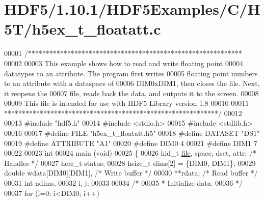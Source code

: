 \hypertarget{_h_d_f5_21_810_81_2_h_d_f5_examples_2_c_2_h5_t_2h5ex__t__floatatt_8c_source}{}\section{H\+D\+F5/1.10.1/\+H\+D\+F5\+Examples/\+C/\+H5\+T/h5ex\+\_\+t\+\_\+floatatt.c}
\label{_h_d_f5_21_810_81_2_h_d_f5_examples_2_c_2_h5_t_2h5ex__t__floatatt_8c_source}

\begin{DoxyCode}
00001 \textcolor{comment}{/************************************************************}
00002 \textcolor{comment}{}
00003 \textcolor{comment}{  This example shows how to read and write floating point}
00004 \textcolor{comment}{  datatypes to an attribute.  The program first writes}
00005 \textcolor{comment}{  floating point numbers to an attribute with a dataspace of}
00006 \textcolor{comment}{  DIM0xDIM1, then closes the file.  Next, it reopens the}
00007 \textcolor{comment}{  file, reads back the data, and outputs it to the screen.}
00008 \textcolor{comment}{}
00009 \textcolor{comment}{  This file is intended for use with HDF5 Library version 1.8}
00010 \textcolor{comment}{}
00011 \textcolor{comment}{ ************************************************************/}
00012 
00013 \textcolor{preprocessor}{#include "hdf5.h"}
00014 \textcolor{preprocessor}{#include <stdio.h>}
00015 \textcolor{preprocessor}{#include <stdlib.h>}
00016 
00017 \textcolor{preprocessor}{#define FILE            "h5ex\_t\_floatatt.h5"}
00018 \textcolor{preprocessor}{#define DATASET         "DS1"}
00019 \textcolor{preprocessor}{#define ATTRIBUTE       "A1"}
00020 \textcolor{preprocessor}{#define DIM0            4}
00021 \textcolor{preprocessor}{#define DIM1            7}
00022 
00023 \textcolor{keywordtype}{int}
00024 main (\textcolor{keywordtype}{void})
00025 \{
00026     hid\_t       \hyperlink{structfile}{file}, space, dset, attr;            \textcolor{comment}{/* Handles */}
00027     herr\_t      status;
00028     hsize\_t     dims[2] = \{DIM0, DIM1\};
00029     \textcolor{keywordtype}{double}      wdata[DIM0][DIM1],                  \textcolor{comment}{/* Write buffer */}
00030                 **rdata;                            \textcolor{comment}{/* Read buffer */}
00031     \textcolor{keywordtype}{int}         ndims,
00032                 i, j;
00033 
00034     \textcolor{comment}{/*}
00035 \textcolor{comment}{     * Initialize data.}
00036 \textcolor{comment}{     */}
00037     \textcolor{keywordflow}{for} (i=0; i<DIM0; i++)

\end{DoxyCode}
